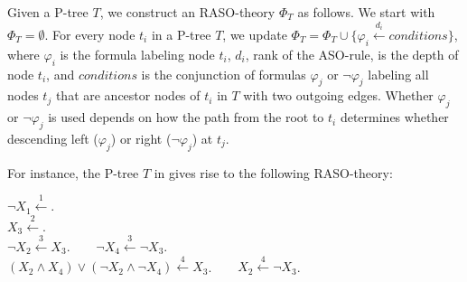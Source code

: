 %

Given a P-tree $T$, we construct an RASO-theory $\Phi_T$ as follows.
We start with $\Phi_T=\emptyset$.
For every node $t_i$ in a P-tree $T$, we update
$\Phi_T=\Phi_T \cup \{\varphi_i \overset{d_i}{\leftarrow} conditions\}$,
where $\varphi_i$ is the formula labeling node $t_i$,
$d_i$, rank of the ASO-rule, is the depth of node $t_i$,
and $conditions$ is the conjunction
of formulas $\varphi_j$ or $\neg \varphi_j$ labeling all nodes $t_j$
that are ancestor nodes of $t_i$ in $T$ with two outgoing edges.
Whether $\varphi_j$ or $\neg \varphi_j$ is used depends on how the path 
from the root to
$t_i$ determines whether descending left ($\varphi_j$) or right ($\neg \varphi_j$)
at $t_j$.

For instance, the P-tree $T$ in  gives rise to the following RASO-theory:

	\begin{framed}
		\noindent $\neg X_1 \overset{1}{\leftarrow}$.  \\%
		$X_3 \overset{2}{\leftarrow}$.\\
		$\neg X_2 \overset{3}{\leftarrow} X_3$.  $\;\;\;\;\;$
		$\neg X_4 \overset{3}{\leftarrow} \neg X_3$.\\
		$(X_2 \land X_4) \lor (\neg X_2 \land \neg X_4) \overset{4}{\leftarrow} X_3$. $\;\;\;\;\;$
		$X_2 \overset{4}{\leftarrow} \neg X_3$.
	\end{framed}

